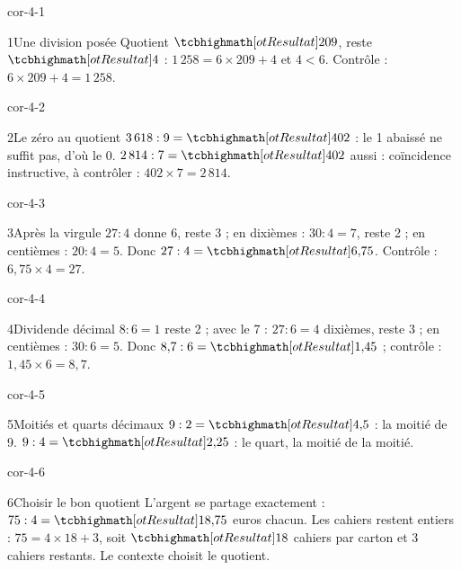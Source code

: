 \clearpage\pagestyle{otMain}\setlength{\otBlocEspacement}{2.5mm}\fontsize{11}{15}\selectfont{}
\begin{blocLivre}{cor-4-1}\begin{corrige}{1}{Une division posée}
Quotient $\res{209}$, reste $\res4$ : $1\,258=6\times209+4$ et $4<6$. Contrôle : $6\times209+4=1\,258$.
\end{corrige}\end{blocLivre}
\begin{blocLivre}{cor-4-2}\begin{corrige}{2}{Le zéro au quotient}
$3\,618:9=\res{402}$ : le 1 abaissé ne suffit pas, d’où le 0. $2\,814:7=\res{402}$ aussi : coïncidence instructive, à contrôler : $402\times7=2\,814$.
\end{corrige}\end{blocLivre}
\begin{blocLivre}{cor-4-3}\begin{corrige}{3}{Après la virgule}
$27:4$ donne 6, reste 3 ; en dixièmes : $30:4=7$, reste 2 ; en centièmes : $20:4=5$. Donc $27:4=\res{6{,}75}$. Contrôle : $6{,}75\times4=27$.
\end{corrige}\end{blocLivre}
\begin{blocLivre}{cor-4-4}\begin{corrige}{4}{Dividende décimal}
$8:6=1$ reste 2 ; avec le 7 : $27:6=4$ dixièmes, reste 3 ; en centièmes : $30:6=5$. Donc $8{,}7:6=\res{1{,}45}$ ; contrôle : $1{,}45\times6=8{,}7$.
\end{corrige}\end{blocLivre}
\begin{blocLivre}{cor-4-5}\begin{corrige}{5}{Moitiés et quarts décimaux}
$9:2=\res{4{,}5}$ : la moitié de 9. $9:4=\res{2{,}25}$ : le quart, la moitié de la moitié.
\end{corrige}\end{blocLivre}
\begin{blocLivre}{cor-4-6}\begin{corrige}{6}{Choisir le bon quotient}
L’argent se partage exactement : $75:4=\res{18{,}75}$ euros chacun. Les cahiers restent entiers : $75=4\times18+3$, soit $\res{18}$ cahiers par carton et 3 cahiers restants. Le contexte choisit le quotient.
\end{corrige}\end{blocLivre}
